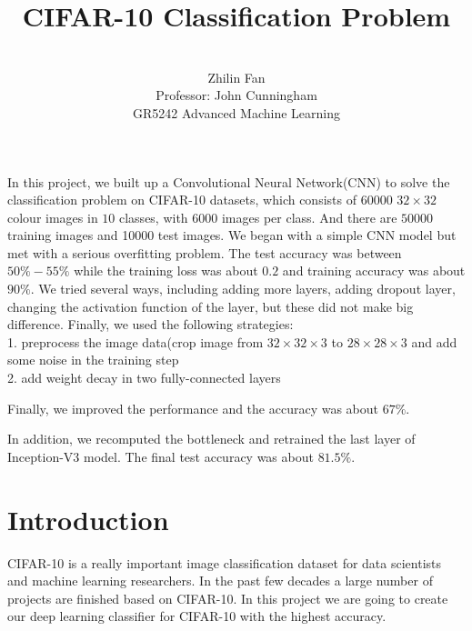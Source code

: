 \documentclass[hyperref]{article}
\theoremstyle{nonumberplain}
\begin{document}
\title{\bf CIFAR-10 Classification Problem}
\author{\sffamily \\ Zhilin Fan\\
    {\sffamily Professor: John Cunningham}\\
    {\sffamily GR5242 Advanced Machine Learning}}
\renewcommand{\thefootnote}{\fnsymbol{footnote}}
\maketitle

\abstract
In this project, we built up a Convolutional Neural Network(CNN) to solve the classification problem on CIFAR-10 datasets, which consists of $60000$ $32\times32$ colour images in $10$ classes, with $6000$ images per class. And there are $50000$ training images and 10000 test images.
We began with a simple CNN model but met with a serious overfitting problem. The test accuracy was between $50\%-55\%$ while the training loss was about $0.2$ and training accuracy was about $90\%$. We tried several ways, including adding more layers, adding dropout layer, changing the activation function of the layer, but these did not make big difference. Finally, we used the following strategies: \\
1. preprocess the image data(crop image from $32\times32\times3$ to $28\times28\times3$ and add some noise in the training step \\
2. add weight decay in two fully-connected layers

Finally, we improved the performance and the accuracy was about $67\%$.

In addition, we recomputed the bottleneck and retrained the last layer of Inception-V3 model. The final test accuracy was about $ 81.5\%$.

\newpage
\tableofcontents
\newpage

\section{Introduction}
CIFAR-10 is a really important image classification dataset for data scientists and machine learning researchers. In the past few decades a large number of projects are finished based on CIFAR-10. In this project we are going to create our deep learning classifier for CIFAR-10 with the highest accuracy.
\end{document}
